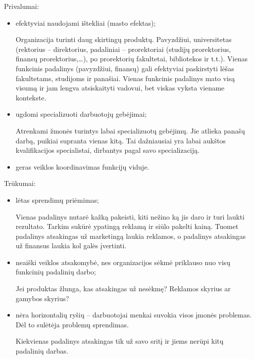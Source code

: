Privalumai:
\begin{itemize}
  \item efektyviai naudojami ištekliai (masto efektas);
    \begin{note}
      Organizacija turinti daug skirtingų produktų. Pavyzdžiui,
      universitetas (rektorius – direktorius, padaliniai – prorektoriai
      (studijų prorektorius, finansų prorektorius,…), po prorektorių
      fakultetai, bibliotekos ir t.t.). Vienas funkcinis padalinys
      (pavyzdžiui, finansų) gali efektyviai paskirstyti lėšas fakultetams,
      studijoms ir panašiai. Vienas funkcinis padalinys mato visą
      visumą ir jam lengva atsiskaityti vadovui, bet viskas vyksta
      viename kontekste.
    \end{note}
  \item ugdomi specializuoti darbuotojų gebėjimai;
    \begin{note}
      Atrenkami žmonės turintys labai specializuotų gebėjimų. Jie
      atlieka panašų darbą, puikiai supranta vienas kitą. Tai
      dažniausiai yra labai aukštos kvalifikacijos specialistai,
      dirbantys pagal savo specializaciją.
    \end{note}
  \item geras veiklos koordinavimas funkcijų viduje.
\end{itemize}

Trūkumai:
\begin{itemize}
  \item lėtas sprendimų priėmimas;
    \begin{exmp}
      Vienas padalinys nutarė kažką pakeisti, kiti nežino ką jis daro
      ir turi laukti rezultato. Tarkim sukūrė ypatingą reklamą ir siūlo
      pakelti kainą. Tuomet padalinys atsakingas už marketingą laukia
      reklamos, o padalinys atsakingas už finansus laukia kol galės
      įvertinti.
    \end{exmp}
  \item neaiški veiklos atsakomybė, nes organizacijos sėkmė priklauso
    nuo visų funkcinių padalinių darbo;
    \begin{exmp}
      Jei produktas žlunga, kas atsakingas už nesėkmę? Reklamos skyrius
      ar gamybos skyrius?
    \end{exmp}
  \item nėra horizontalių ryšių – darbuotojai menkai suvokia visos
    įmonės problemas. Dėl to sulėtėja problemų sprendimas.
    \begin{note}
      Kiekvienas padalinys atsakingas tik už savo sritį ir jiems
      nerūpi kitų padalinių darbas.
    \end{note}
\end{itemize}

